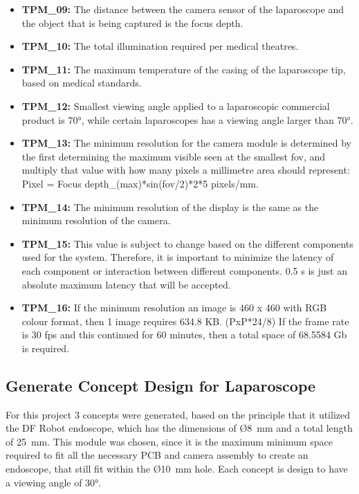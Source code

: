 \begin{itemize}
    \item\textbf{TPM\_09:} The distance between the camera sensor of the laparoscope and the object that is being captured is the focus depth. 

    \item\textbf{TPM\_10:} The total illumination required per medical theatres.
    
    \item\textbf{TPM\_11:} The maximum temperature of the casing of the laparoscope tip, based on medical standards.

    \item\textbf{TPM\_12:} Smallest viewing angle applied to a laparoscopic commercial product is 70°,  while certain laparoscopes has a viewing angle larger than 70°.

    \item\textbf{TPM\_13:} The minimum resolution for the camera module is determined by the first determining the maximum visible seen at the smallest fov, and multiply that value with how many pixels a millimetre area should represent: Pixel = Focus depth\_(max)*sin(fov/2)*2*5 pixels/mm.

    \item\textbf{TPM\_14:} The minimum resolution of the display is the same as the minimum resolution of the camera.

    \item\textbf{TPM\_15:} This value is subject to change based on the different components used for the system. Therefore, it is important to minimize the latency of each component or interaction between different components. 0.5 s is just an absolute maximum latency that will be accepted.

    \item\textbf{TPM\_16:} If the minimum resolution an image is 460 x 460 with RGB colour format, then 1 image requires 634.8 KB. (PxP*24/8) If the frame rate is 30 fps and this continued for 60 minutes, then a total space of 68.5584 Gb is required.

\end{itemize}
\subsection{Generate Concept Design for Laparoscope}

For this project 3 concepts were generated, based on the principle that it utilized the DF Robot endoscope, which has the dimensions of Ø8~mm and a total length of 25~mm. This module was chosen, since it is the maximum minimum space required to fit all the necessary PCB and camera assembly to create an endoscope, that still fit within the Ø10~mm hole. Each concept is design to have a viewing angle of 30°.

